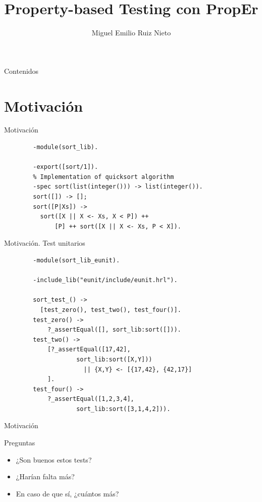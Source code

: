 \documentclass{beamer}
\title[ACFI]{Property-based Testing con PropEr}
\author[M. Ruiz (UCM)]{Miguel Emilio Ruiz Nieto}
\date{\mydate}
\begin{document}
  \begin{frame}
    \titlepage
  \end{frame}

  \begin{frame}{Contenidos}
    \tableofcontents[hideallsubsections]
  \end{frame}

  \section{Motivación}
    \begin{frame}[fragile]{Motivación}
      \begin{verbatim}
        -module(sort_lib).

        -export([sort/1]).
        % Implementation of quicksort algorithm
        -spec sort(list(integer())) -> list(integer()).
        sort([]) -> [];
        sort([P|Xs]) ->
          sort([X || X <- Xs, X < P]) ++
              [P] ++ sort([X || X <- Xs, P < X]).
      \end{verbatim}
    \end{frame}

    \begin{frame}[fragile]{Motivación. Test unitarios}
      \begin{verbatim}
        -module(sort_lib_eunit).

        -include_lib("eunit/include/eunit.hrl").

        sort_test_() ->
          [test_zero(), test_two(), test_four()].
        test_zero() ->
            ?_assertEqual([], sort_lib:sort([])).
        test_two() ->
            [?_assertEqual([17,42],
                    sort_lib:sort([X,Y]))
                      || {X,Y} <- [{17,42}, {42,17}]
            ].
        test_four() ->
            ?_assertEqual([1,2,3,4],
                    sort_lib:sort([3,1,4,2])).
      \end{verbatim}
    \end{frame}

    \begin{frame}{Motivación}
      \begin{block}{Preguntas}
        \begin{itemize}
          \item ¿Son buenos estos tests?
          \item ¿Harían falta más?
          \item En caso de que sí, ¿cuántos más?
        \end{itemize}
      \end{block}
    \end{frame}
\end{document}
